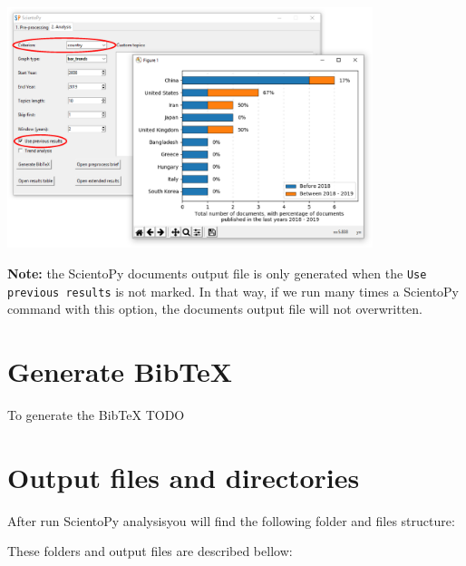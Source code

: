 \documentclass[10pt,letterpaper]{article}
\begin{document}
\begin{center}
	\includegraphics[width=0.8\textwidth]{./figures/win_analysis9.eps}
\end{center}

\textbf{Note:} the ScientoPy documents output file is only generated when the \verb|Use previous results| is not marked. In that way, if we run many times a ScientoPy command with this option, the documents output file will not overwritten.

\section{Generate BibTeX}

To generate the BibTeX TODO

\section{Output files and directories}

After run ScientoPy analysisyou will find the following folder and files structure:

\vspace*{0.5cm}

These folders and output files are described bellow:
\end{document}
